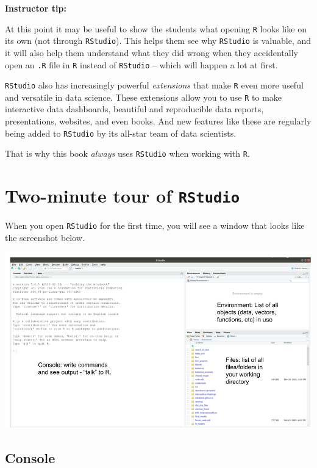 \documentclass[]{book}
\begin{document}
\leavevmode\hypertarget{tip-text}{}%
\textbf{Instructor tip:}

At this point it may be useful to show the students what opening \texttt{R} looks like on its own (not through \texttt{RStudio}). This helps them see why \texttt{RStudio} is valuable, and it will also help them understand what they did wrong when they accidentally open an \texttt{.R} file in \texttt{R} instead of \texttt{RStudio} -- which will happen a lot at first.

\texttt{RStudio} also has increasingly powerful \emph{extensions} that make \texttt{R} even more useful and versatile in data science. These extensions allow you to use \texttt{R} to make interactive data dashboards, beautiful and reproducible data reports, presentations, websites, and even books. And new features like these are regularly being added to \texttt{RStudio} by its all-star team of data scientists.

That is why this book \emph{always} uses \texttt{RStudio} when working with \texttt{R}.

\hypertarget{two-minute-tour-of-rstudio}{%
\section*{\texorpdfstring{Two-minute tour of \texttt{RStudio}}{Two-minute tour of RStudio}}\label{two-minute-tour-of-rstudio}}

When you open \texttt{RStudio} for the first time, you will see a window that looks like the screenshot below.

\includegraphics{img/rstudio_windows.png}

\hypertarget{console}{%
\subsection*{Console}\label{console}}
\end{document}
